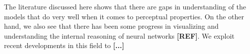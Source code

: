 
\par
The literature discussed here shows that there are gaps in understanding of the models that do very well when it comes to perceptual properties. On the other hand, we also see that there has been some progress in visualizing and understanding the internal reasoning of neural networks \textbf{[REF]}. We exploit recent developments in this field to \textbf{[...]} 
